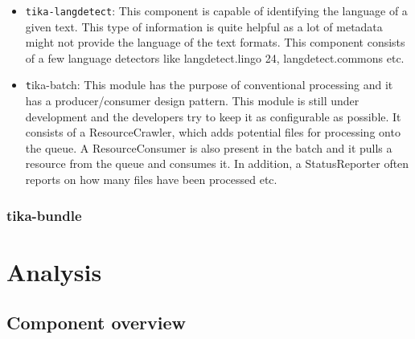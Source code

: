 \documentclass{article}
\begin{document}
\begin{itemize}
    \item\texttt{tika-langdetect}: This component is capable of identifying the language of a given text. This type of information is quite helpful as a lot of metadata might not provide the language of the text formats. This component consists of a few language detectors like langdetect.lingo 24, langdetect.commons etc. 
    \item\texttt tika-batch: This module has the purpose of conventional processing and it has a producer/consumer design pattern. This module is still under development and the developers try to keep it as configurable as possible. It consists of a ResourceCrawler, which adds potential files for processing onto the queue. A ResourceConsumer is also present in the batch and it pulls a resource from the queue and consumes it. In addition, a StatusReporter often reports on how many files have been processed etc.
    \end{itemize}

\subsubsection{tika-bundle}




\appendix
\section{Analysis}
\subsection{Component overview}
\end{document}
